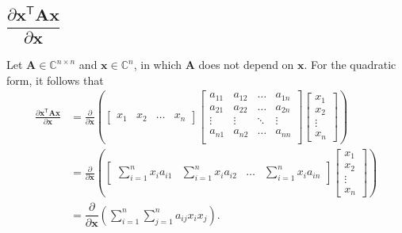 \documentclass{article}
\newcommand{\trans}{\mathsf{T}}
\begin{document}
\subsection{\(\dfrac{\partial \mathbf{x}^\trans \mathbf{A} \mathbf{x}}{\partial \mathbf{x}}\)}
Let \(\mathbf{A}\in \mathbb{C}^{n\times n}\) and \(\mathbf{x} \in \mathbb{C}^{n}\), in which \(\mathbf{A}\) does not depend on \(\mathbf{x}\). For the quadratic form, it follows that
\begin{align}
    \frac{\partial \mathbf{x}^\trans \mathbf{A} \mathbf{x}}{\partial \mathbf{x}} &= \frac{\partial}{\partial \mathbf{x}} \left(
    \begin{bmatrix}
        x_{1} & x_{2} & \dots & x_{n}
    \end{bmatrix}
    \begin{bmatrix}
        a_{11} & a_{12} & \dots & a_{1n} \\
        a_{21} & a_{22} & \dots & a_{2n} \\
        \vdots & \vdots & \ddots & \vdots \\
        a_{n1} & a_{n2} & \dots & a_{nn} \\
    \end{bmatrix} \begin{bmatrix}
        x_{1} \\ x_{2} \\ \vdots \\ x_{n}
    \end{bmatrix} \right) \\
    &= \frac{\partial}{\partial \mathbf{x}} \left(
			\begin{bmatrix}
				\displaystyle \sum_{i = 1}^{n} x_{i}a_{i1} & 
				\displaystyle \sum_{i = 1}^{n} x_{i}a_{i2} & 
				\dots & 
				\displaystyle \sum_{i = 1}^{n} x_{i}a_{in}
			\end{bmatrix} \begin{bmatrix}
				x_{1} \\ x_{2} \\ \vdots \\ x_{n}
			\end{bmatrix} \right) \\
            &= \dfrac{\partial}{\partial \mathbf{x}} \left(
				\sum_{i = 1}^{n}\sum_{j = 1}^{n} a_{ij} x_{i} x_{j}
			\right).
\end{align}
\end{document}
